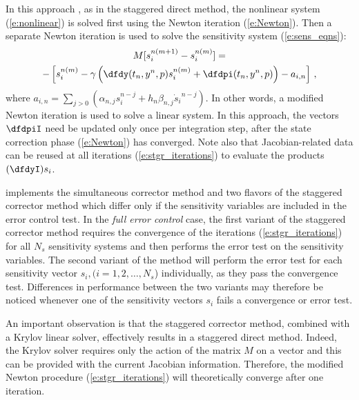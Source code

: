 \begin{itemize}
  In this approach \cite{FTB:97}, as in the staggered direct method,
  the nonlinear system (\ref{e:nonlinear}) is solved first using the Newton
  iteration (\ref{e:Newton}). Then a separate Newton iteration is used to solve the
  sensitivity system (\ref{e:sens_eqns}):
  \begin{multline}\label{e:stgr_iterations}
    M [s_{i}^{n(m+1)} - s_{i}^{n(m)}]= \\
    - \left[ s_{i}^{n(m)} - 
    \gamma \left( \dfdy (t_n , y^n, p) s_{i}^{n(m)} + \dfdpi (t_n , y^n , p) \right)
    -a_{i,n} \right] \, ,
  \end{multline}
  where $a_{i,n}=\sum_{j>0}(\alpha_{n,j}s_{i}^{n-j}+h_n\beta_{n,j}{{\dot s}_i}^{n-j})$.
  In other words, a modified Newton iteration is used to solve a linear system.
  In this approach, the vectors $\dfdpiI$ need be updated only once per
  integration step, after the state correction phase (\ref{e:Newton}) has
  converged. Note also that Jacobian-related data can be reused at all iterations
  (\ref{e:stgr_iterations}) to evaluate the products $(\dfdyI) s_i$.
\end{itemize}  

{\cvodes} implements the simultaneous corrector method and two flavors of the 
staggered corrector method which differ only if the sensitivity variables are
included in the error control test.  
In the {\em full error control} case, the first variant of the staggered corrector
method requires the convergence of the iterations (\ref{e:stgr_iterations}) for
all $N_s$ sensitivity systems and then performs the error test on the sensitivity
variables. The second variant of the method will perform the error test for each
sensitivity vector $s_i, (i=1,2,\ldots,N_s$) individually, as they pass the
convergence test. Differences in performance between the two variants may therefore
be noticed whenever one of the sensitivity vectors $s_i$ fails a convergence or
error test. 

An important observation is that the staggered corrector method, combined with 
a Krylov linear solver, effectively results in a staggered direct method. 
Indeed, the Krylov solver requires only the action of the matrix $M$ on a vector
and this can be provided with the current Jacobian information. Therefore, the
modified Newton procedure (\ref{e:stgr_iterations}) will theoretically converge 
after one iteration.

